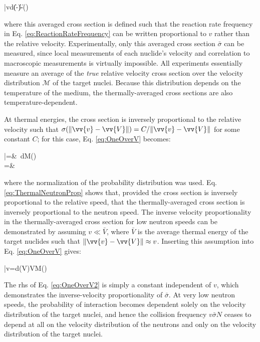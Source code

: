 \beq
\label{eq:OneOverV}
\bar{\sigma}v\equiv\int d\sigma(\|-\|)\|-\|()
\eeq

where this averaged cross section is defined such that the reaction rate frequency in Eq. \eqref{eq:ReactionRateFrequency} can be written proportional to \(v\) rather than the relative velocity. Experimentally, only this averaged cross section \(\bar{\sigma}\) can be measured, since local measurements of each nuclide's velocity and correlation to macroscopic measurements is virtually impossible. All experiments essentially measure an average of the {\it true} relative velocity cross section over the velocity distribution \(\mathscr{M}\) of the target nuclei. Because this distribution depends on the temperature of the medium, the thermally-averaged cross sections are also temperature-dependent.

At thermal energies, the cross section is inversely proportional to the relative velocity such that \(\sigma(\|\vv{v}-\vv{V}\|)=C/\|\vv{v}-\vv{V}\|\) for some constant \(C\); for this case, Eq. \eqref{eq:OneOverV} becomes:

\beqa
\label{eq:ThermalNeutronProp}
\bar{\sigma}=&\ \int dM()\\
=&\ 
\eeqa

where the normalization of the probability distribution was used. Eq. \eqref{eq:ThermalNeutronProp} shows that, provided the cross section is inversely proportional to the relative speed, that the thermally-averaged cross section is inversely proportional to the neutron speed. The inverse velocity proportionality in the thermally-averaged cross section for low neutron speeds can be demonstrated by assuming \(v\ll \bar{V}\), where \(\bar{V}\) is the average thermal energy of the target nuclides such that \(\|\vv{v}-\vv{V}\|\approx v\). Inserting this assumption into Eq. \eqref{eq:OneOverV} gives:

\beq
\label{eq:OneOverV2}
\bar{\sigma}v=\int d\sigma(V)VM()
\eeq

The \gls{rhs} of Eq. \eqref{eq:OneOverV2} is simply a constant independent of \(v\), which demonstrates the inverse-velocity proportionality of \(\bar{\sigma}\). At very low neutron speeds, the probability of interaction becomes dependent solely on the velocity distribution of the target nuclei, and hence the collision frequency \(v\bar{\sigma}N\) ceases to depend at all on the velocity distribution of the neutrons and only on the velocity distribution of the target nuclei. 

